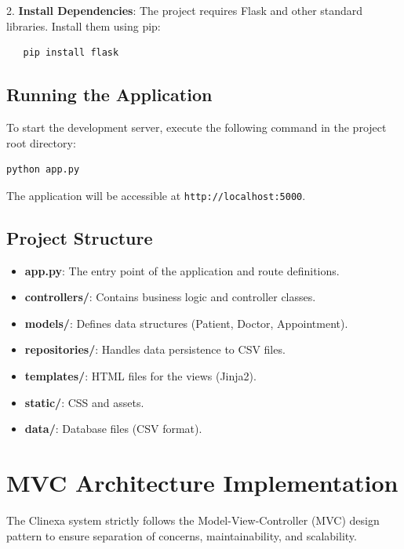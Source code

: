 \documentclass[12pt,a4paper]{article}
\begin{document}
2. \textbf{Install Dependencies}:
   The project requires Flask and other standard libraries. Install them using pip:
   \begin{verbatim}
   pip install flask
   \end{verbatim}

\subsection{Running the Application}
To start the development server, execute the following command in the project root directory:
\begin{verbatim}
python app.py
\end{verbatim}
The application will be accessible at \texttt{http://localhost:5000}.

\subsection{Project Structure}
\begin{itemize}
    \item \textbf{app.py}: The entry point of the application and route definitions.
    \item \textbf{controllers/}: Contains business logic and controller classes.
    \item \textbf{models/}: Defines data structures (Patient, Doctor, Appointment).
    \item \textbf{repositories/}: Handles data persistence to CSV files.
    \item \textbf{templates/}: HTML files for the views (Jinja2).
    \item \textbf{static/}: CSS and assets.
    \item \textbf{data/}: Database files (CSV format).
\end{itemize}


\section{MVC Architecture Implementation}

The Clinexa system strictly follows the Model-View-Controller (MVC) design pattern to ensure separation of concerns, maintainability, and scalability.
\end{document}
